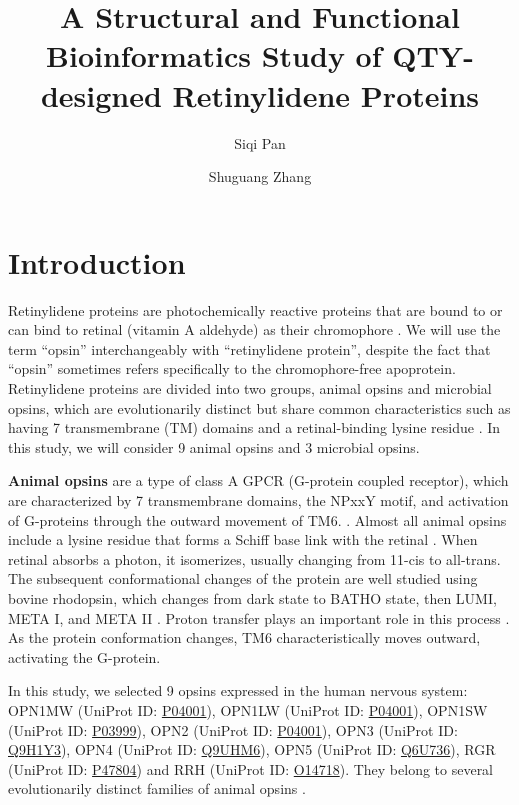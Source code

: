 \documentclass[fleqn, 10pt, lineno]{manuscript}
\title{A Structural and Functional Bioinformatics Study of QTY-designed Retinylidene Proteins}
\author[1]{Siqi Pan}
\author[2]{Shuguang Zhang}
\affil[1]{Shanghai World Foreign Language Academy, 400 Baihua Street, Shanghai 200233, China}
\affil[2]{Lab of Molecular Architecture, Media Lab, Massachusetts Institute of Technology, 77 Massachusetts Avenue, Cambridge, MA 02139, USA}
\begin{document}
\flushbottom
\maketitle
\thispagestyle{empty}

\section*{Introduction}

Retinylidene proteins are photochemically reactive proteins that are bound to or can bind to retinal (vitamin A aldehyde) as their chromophore \citep{Spudich_2000}. We will use the term ``opsin'' interchangeably with ``retinylidene protein'', despite the fact that ``opsin'' sometimes refers specifically to the chromophore-free apoprotein. Retinylidene proteins are divided into two groups, animal opsins and microbial opsins, which are evolutionarily distinct but share common characteristics such as having 7 transmembrane (TM) domains and a retinal-binding lysine residue \citep{Yee_2013, Spudich_2000}. In this study, we will consider 9 animal opsins and 3 microbial opsins. 

\textbf{Animal opsins} are a type of class A GPCR (G-protein coupled receptor), which are characterized by 7 transmembrane domains, the NPxxY motif, and activation of G-proteins through the outward movement of TM6. \citep{Zhou_2019}. Almost all animal opsins include a lysine residue that forms a Schiff base link with the retinal \citep{Guhmann_2022}. When retinal absorbs a photon, it isomerizes, usually changing from 11-cis to all-trans. The subsequent conformational changes of the protein are well studied using bovine rhodopsin, which changes from dark state to BATHO state, then LUMI, META I, and META II \citep{Okada_2001}. Proton transfer plays an important role in this process \citep{Mahalingam_2008}. As the protein conformation changes, TM6 characteristically moves outward, activating the G-protein. 

In this study, we selected 9 opsins expressed in the human nervous system: OPN1MW (UniProt ID: \href{https://www.uniprot.org/uniprotkb/P04001/entry}{P04001}), OPN1LW (UniProt ID: \href{https://www.uniprot.org/uniprotkb/P04000/entry}{P04001}), OPN1SW (UniProt ID: \href{https://www.uniprot.org/uniprotkb/P03999/entry}{P03999}), OPN2 (UniProt ID: \href{https://www.uniprot.org/uniprotkb/P08100/entry}{P04001}), OPN3 (UniProt ID: \href{https://www.uniprot.org/uniprotkb/Q9H1Y3/entry}{Q9H1Y3}), OPN4 (UniProt ID: \href{https://www.uniprot.org/uniprotkb/Q9UHM6/entry}{Q9UHM6}), OPN5 (UniProt ID: \href{https://www.uniprot.org/uniprotkb/Q6U736/entry}{Q6U736}), RGR (UniProt ID: \href{https://www.uniprot.org/uniprotkb/P47804/entry}{P47804}) and RRH (UniProt ID: \href{https://www.uniprot.org/uniprotkb/O14718/entry}{O14718}). They belong to several evolutionarily distinct families of animal opsins \citep{Terakita_2005}. 
\end{document}
